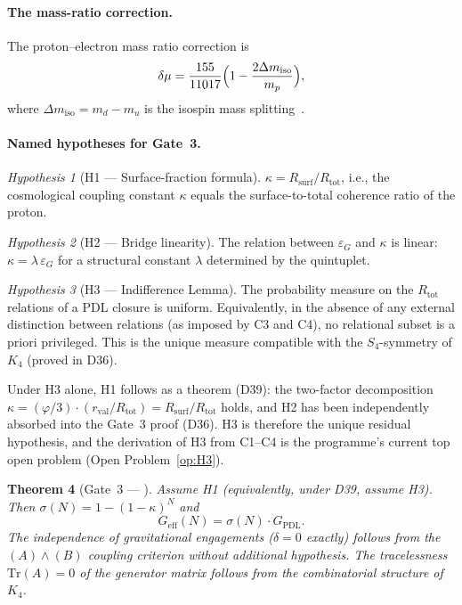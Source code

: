 \documentclass[11pt,a4paper]{article}
\theoremstyle{plain}
\newtheorem{theorem}{Theorem}[section]
\theoremstyle{definition}
\theoremstyle{remark}
\newtheorem{hypothesis}[theorem]{Hypothesis}
\newcommand{\Kfour}{K_4}
\newcommand{\Geff}{G_{\mathrm{eff}}}
\newcommand{\GPDL}{G_{\mathrm{PDL}}}
\newcommand{\epsG}{\varepsilon_G}
\newcommand{\rval}{r_{\mathrm{val}}}
\newcommand{\Rsurf}{R_{\mathrm{surf}}}
\newcommand{\Rtot}{R_{\mathrm{tot}}}
\begin{document}
\paragraph{The mass-ratio correction.}
The proton--electron mass ratio correction is
\[
\delta\mu = \frac{155}{11017}\Bigl(1 - \frac{2\Delta m_{\mathrm{iso}}}{m_p}\Bigr),
\]
where $\Delta m_{\mathrm{iso}} = m_d - m_u$ is the isospin mass splitting~\citep{D28}.

\paragraph{Named hypotheses for Gate~3.}

\begin{hypothesis}[H1 — Surface-fraction formula]
$\kappa = \Rsurf/\Rtot$, i.e., the cosmological coupling constant $\kappa$ equals the surface-to-total coherence ratio of the proton.
\end{hypothesis}

\begin{hypothesis}[H2 — Bridge linearity]
The relation between $\epsG$ and $\kappa$ is linear: $\kappa = \lambda\,\epsG$ for a structural constant $\lambda$ determined by the quintuplet.
\end{hypothesis}

\begin{hypothesis}[H3 — Indifference Lemma]
The probability measure on the $\Rtot$ relations of a PDL closure is uniform.
Equivalently, in the absence of any external distinction between relations (as imposed by C3 and C4), no relational subset is a priori privileged.
This is the unique measure compatible with the $S_4$-symmetry of $\Kfour$ (proved in D36).
\end{hypothesis}

Under H3 alone, H1 follows as a theorem (D39): the two-factor decomposition $\kappa = (\varphi/3)\cdot(\rval/\Rtot) = \Rsurf/\Rtot$ holds, and H2 has been independently absorbed into the Gate~3 proof (D36).
H3 is therefore the unique residual hypothesis, and the derivation of H3 from C1--C4 is the programme's current top open problem (Open Problem~\ref{op:H3}).

\begin{theorem}[Gate~3 — \citep{D36}]
\label{thm:Gate3}
Assume H1 (equivalently, under D39, assume H3).
Then $\sigma(N) = 1-(1-\kappa)^N$ and
\[
\Geff(N) = \sigma(N)\cdot\GPDL.
\]
The independence of gravitational engagements ($\delta=0$ exactly) follows from the $(A)\wedge(B)$ coupling criterion without additional hypothesis.
The tracelessness $\mathrm{Tr}(A)=0$ of the generator matrix follows from the combinatorial structure of $\Kfour$.
\end{theorem}
\end{document}
